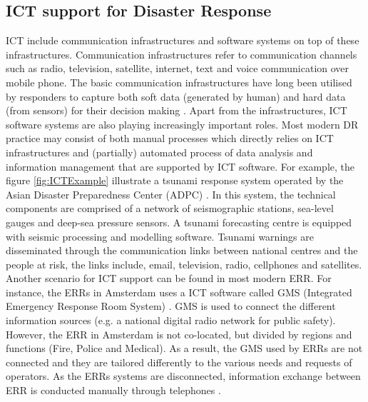 \subsection{ICT support for Disaster Response}
\acf{ICT} include communication infrastructures and software systems on top of these infrastructures. Communication infrastructures refer to communication channels such as radio, television, satellite, internet, text and voice communication over mobile phone. The basic communication infrastructures have long been utilised by responders to capture both soft data (generated by human) and hard data (from sensors) for their decision making \citep{Fischer2012}. Apart from the infrastructures, \ac{ICT} software systems are also playing increasingly important roles. Most modern DR practice may consist of both manual processes which directly relies on \ac{ICT} infrastructures and (partially) automated process of data analysis and information management that are supported by \ac{ICT} software. For example, the figure \ref{fig:ICTExample} illustrate a tsunami response system operated by the Asian Disaster Preparedness Center (ADPC) \citep{Wattegama2012}. In this system,  the technical components are comprised of a network of seismographic stations, sea-level gauges and deep-sea pressure sensors. A tsunami forecasting centre is equipped with seismic processing and modelling software.  Tsunami warnings are disseminated through the communication links between national centres and the people at risk, the links include, email, television, radio, cellphones and satellites. Another scenario for \ac{ICT} support can be found in most modern \acf{ERR}. For instance, the \ac{ERR}s in Amsterdam uses a \ac{ICT} software called GMS (Integrated Emergency Response Room System) \citep{Boersma2009}. GMS is used to connect the different information sources (e.g. a national digital radio network for public safety). However, the \ac{ERR} in Amsterdam is not co-located, but divided by regions and functions (Fire, Police and Medical). As a result, the GMS used by \ac{ERR}s are not connected and they are tailored differently to the various needs and requests of operators. As the \acf{ERR}s systems are disconnected, information exchange between \ac{ERR} is conducted manually through telephones \citep{Boersma2009}.\\

